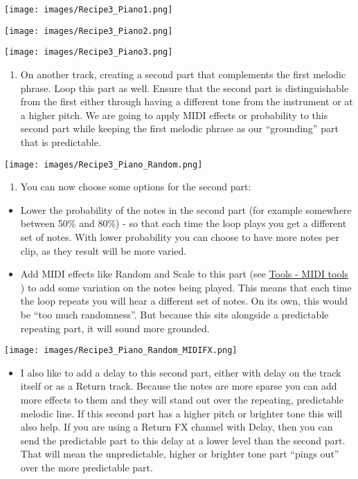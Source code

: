 \documentclass[
  12pt,
  letterpaper,
  oneside,
  open=any]{scrbook}
\providecommand{\tightlist}{%
  \setlength{\itemsep}{0pt}\setlength{\parskip}{0pt}}\usepackage{longtable,booktabs,array}
\begin{document}
\texttt{[image: images/Recipe3\_Piano1.png]}

\texttt{[image: images/Recipe3\_Piano2.png]}

\texttt{[image: images/Recipe3\_Piano3.png]}

\begin{enumerate}
\def\labelenumi{\arabic{enumi}.}
\setcounter{enumi}{1}
\tightlist
\item
  On another track, creating a second part that complements the first
  melodic phrase. Loop this part as well. Ensure that the second part is
  distinguishable from the first either through having a different tone
  from the instrument or at a higher pitch. We are going to apply MIDI
  effects or probability to this second part while keeping the first
  melodic phrase as our ``grounding'' part that is predictable.
\end{enumerate}

\texttt{[image: images/Recipe3\_Piano\_Random.png]}

\begin{enumerate}
\def\labelenumi{\arabic{enumi}.}
\setcounter{enumi}{2}
\tightlist
\item
  You can now choose some options for the second part:
\end{enumerate}

\begin{itemize}
\item
  Lower the probability of the notes in the second part (for example
  somewhere between 50\% and 80\%) - so that each time the loop plays
  you get a different set of notes. With lower probability you can
  choose to have more notes per clip, as they result will be more
  varied.
\item
  Add MIDI effects like Random and Scale to this part (see
  \hyperref[Chapter-004-Tools-MIDI_tools]{Tools - MIDI tools} ) to add
  some variation on the notes being played. This means that each time
  the loop repeats you will hear a different set of notes. On its own,
  this would be ``too much randomness''. But because this sits alongside
  a predictable repeating part, it will sound more grounded.
\end{itemize}

\texttt{[image: images/Recipe3\_Piano\_Random\_MIDIFX.png]}

\begin{itemize}
\tightlist
\item
  I also like to add a delay to this second part, either with delay on
  the track itself or as a Return track. Because the notes are more
  sparse you can add more effects to them and they will stand out over
  the repeating, predictable melodic line. If this second part has a
  higher pitch or brighter tone this will also help. If you are using a
  Return FX channel with Delay, then you can send the predictable part
  to this delay at a lower level than the second part. That will mean
  the unpredictable, higher or brighter tone part ``pings out'' over the
  more predictable part.
\end{itemize}
\end{document}
